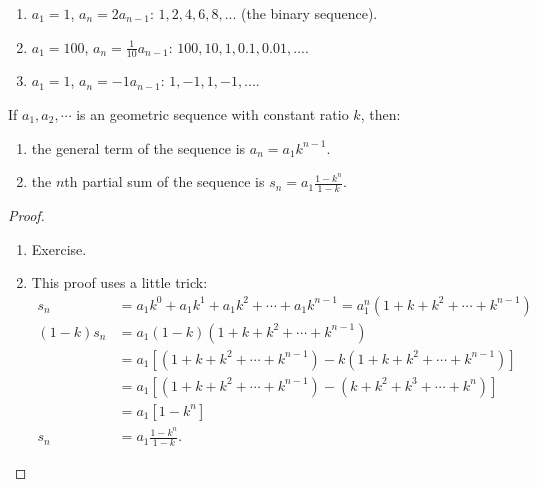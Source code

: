 \begin{ex}\leavevmode
  \begin{enumerate}
    \item $ a_1 = 1 $, $ a_n = 2a_{n - 1} $: $ 1, 2, 4, 6, 8, ... $ (the binary sequence).
    \item $ a_1 = 100 $, $ a_n = \frac{1}{10} a_{n - 1} $: $ 100, 10, 1, 0.1, 0.01, ... $.
    \item $ a_1 = 1 $, $ a_n = -1 a_{n - 1} $: $ 1, -1, 1, -1, ... $.
  \end{enumerate}
\end{ex}


\begin{thm}
  If $ a_1, a_2, \cdots $ is an geometric sequence with constant ratio $ k $, then:
  \begin{enumerate}
    \item the general term of the sequence is $ a_n = a_1 k^{n - 1} $.
    \item the $ n$th partial sum of the sequence is $ s_n = a_1 \frac{1 - k^n}{1 - k}$.
  \end{enumerate}
\end{thm}
\begin{proof}\leavevmode
  \begin{enumerate}
    \item Exercise.
    \item This proof uses a little trick:
      \begin{align*}
               s_n &= a_1 k^0 + a_1 k^1 + a_1 k^2 + \cdots + a_1 k^{n - 1} = a_1^n (1 + k + k^2 + \cdots + k^{n - 1})\\
        (1 - k)s_n &= a_1 (1-k)(1 + k + k^2 + \cdots + k^{n - 1})\\
                   &= a_1 [(1 + k + k^2 + \cdots + k^{n - 1}) - k(1 + k + k^2 + \cdots + k^{n - 1})]\\
                   &= a_1 [(1 + k + k^2 + \cdots + k^{n - 1}) - (k + k^2 + k^3 + \cdots + k^n)]\\
                   &= a_1 [1 - k^n]\\
               s_n &= a_1 \frac{1 - k^n}{1 - k}.
      \end{align*}
  \end{enumerate}
\end{proof}

